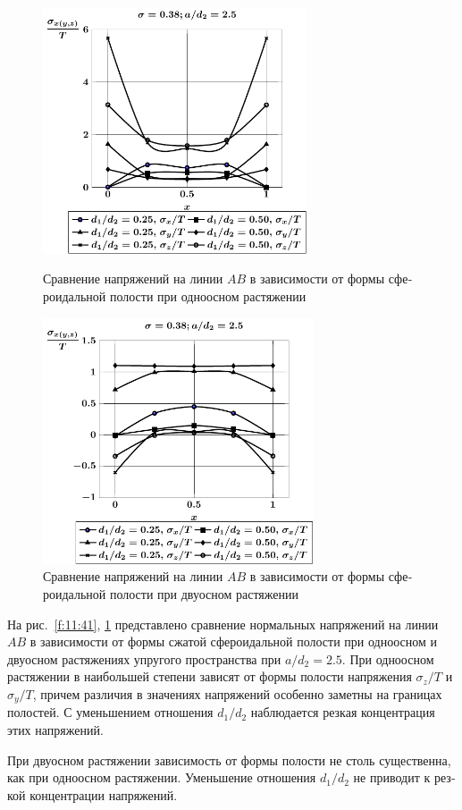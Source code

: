 \begin{russian}
\begin{figure}[h!]
\centering\footnotesize
\parbox[b]{7.5cm}{\centering\includegraphics[width=7.8cm]{periodic-oblate-cav27-d-a25-t1.pdf}
\caption{Сравнение напряжений на линии $AB$ в зависимости от формы сфероидальной полости при одноосном растяжении
\label{f:11:41}}}\hfil\hfil
\parbox[b]{7.5cm}{\centering\includegraphics[width=8cm]{periodic-oblate-cav27-d-a25-t2.pdf}
\caption{Сравнение напряжений на линии $AB$ в зависимости от формы сфероидальной полости при двуосном растяжении
\label{f:11:42}}}
\end{figure}

На рис.~\ref{f:11:41}, \ref{f:11:42} представлено сравнение нормальных напряжений на линии $AB$ в зависимости от формы сжатой сфероидальной полости при одноосном и двуосном растяжениях упругого пространства при $a/d_2=2.5$. При одноосном растяжении в наибольшей степени зависят от формы полости напряжения $\sigma_z/T$ и $\sigma_y/T$, причем различия в значениях напряжений особенно заметны на границах полостей. С уменьшением отношения $d_1/d_2$ наблюдается резкая концентрация этих напряжений.

При двуосном растяжении зависимость от формы полости не столь существенна, как при одноосном растяжении. Уменьшение отношения $d_1/d_2$ не приводит к резкой концентрации напряжений.


\end{russian}
